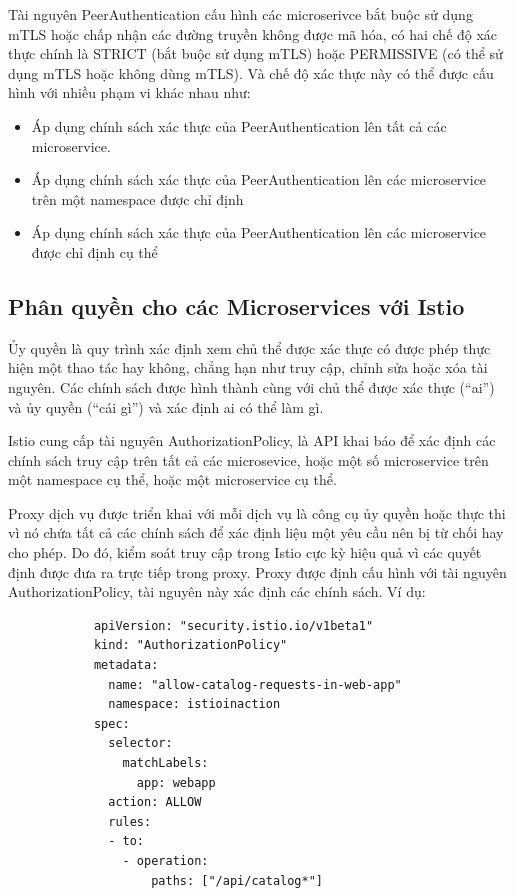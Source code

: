 \documentclass[14pt,a4paper]{book}
\begin{document}
{{			Tài nguyên PeerAuthentication cấu hình các microserivce bắt buộc sử dụng mTLS hoặc chấp nhận các đường truyền không được mã hóa, có hai chế độ xác thực chính là STRICT (bắt buộc sử dụng mTLS) hoặc PERMISSIVE (có thể sử dụng mTLS hoặc không dùng mTLS). Và chế độ xác thực này có thể được cấu hình với nhiều phạm vi khác nhau như:
			
			\begin{itemize}
				\item Áp dụng chính sách xác thực của PeerAuthentication lên tất cả các microservice.
				\item Áp dụng chính sách xác thực của PeerAuthentication lên các microservice trên một namespace được chỉ định
				\item Áp dụng chính sách xác thực của PeerAuthentication lên các microservice được chỉ định cụ thể
			\end{itemize}
			 
			
		\subsection{Phân quyền cho các Microservices với Istio}
			{\hspace{0.6cm}Ủy quyền là quy trình xác định xem chủ thể được xác thực có được phép thực hiện một thao tác hay không, chẳng hạn như truy cập, chỉnh sửa hoặc xóa tài nguyên. Các chính sách được hình thành cùng với chủ thể được xác thực (“ai”) và ủy quyền (“cái gì”) và xác định ai có thể làm gì.}
			
			Istio cung cấp tài nguyên AuthorizationPolicy, là API khai báo để xác định các chính sách truy cập trên tất cả các microsevice, hoặc một số microservice trên một namespace cụ thể, hoặc một microservice cụ thể.
			
			Proxy dịch vụ được triển khai với mỗi dịch vụ là công cụ ủy quyền hoặc thực thi vì nó chứa tất cả các chính sách để xác định liệu một yêu cầu nên bị từ chối hay cho phép. Do đó, kiểm soát truy cập trong Istio cực kỳ hiệu quả vì các quyết định được đưa ra trực tiếp trong proxy. Proxy được định cấu hình với tài nguyên AuthorizationPolicy, tài nguyên này xác định các chính sách. Ví dụ:
			
			\begin{lstlisting}
			apiVersion: "security.istio.io/v1beta1"
			kind: "AuthorizationPolicy"
			metadata:
			  name: "allow-catalog-requests-in-web-app"
			  namespace: istioinaction
			spec:
			  selector:
			    matchLabels:
				  app: webapp
			  action: ALLOW
			  rules:
			  - to:
				- operation:
				    paths: ["/api/catalog*"]
			\end{lstlisting}
			
}}
\end{document}
